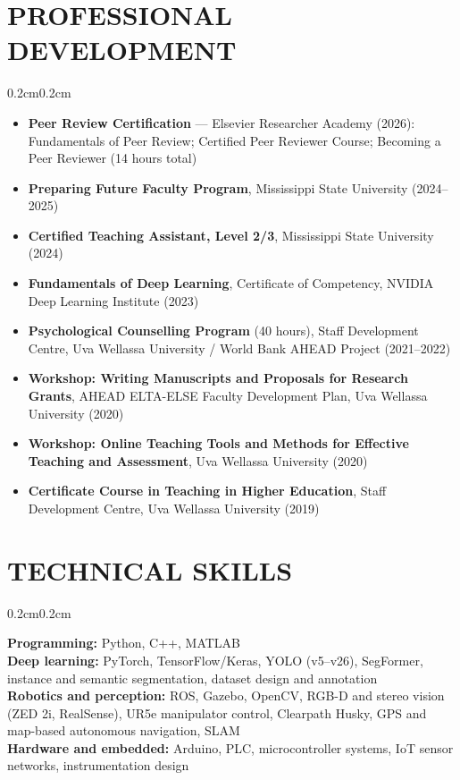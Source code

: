 \documentclass[10pt, letterpaper]{article}
\newenvironment{highlights}{%
    \begin{itemize}[topsep=0.08cm, parsep=0.08cm, partopsep=0pt,
                    itemsep=0pt, leftmargin=0.4cm + 10pt]
}{\end{itemize}}
\newenvironment{onecolentry}{%
    \begin{adjustwidth}{0.2cm}{0.2cm}
}{\end{adjustwidth}}
\begin{document}
\section{PROFESSIONAL DEVELOPMENT}
\vspace{0.08cm}
\begin{onecolentry}
    \begin{highlights}
        \item \textbf{Peer Review Certification} --- Elsevier Researcher Academy
              (2026): Fundamentals of Peer Review; Certified Peer Reviewer Course;
              Becoming a Peer Reviewer (14 hours total)
        \item \textbf{Preparing Future Faculty Program}, Mississippi State University
              (2024--2025)
        \item \textbf{Certified Teaching Assistant, Level 2/3}, Mississippi State
              University (2024)
        \item \textbf{Fundamentals of Deep Learning}, Certificate of Competency,
              NVIDIA Deep Learning Institute (2023)
        \item \textbf{Psychological Counselling Program} (40 hours), Staff Development
              Centre, Uva Wellassa University / World Bank AHEAD Project (2021--2022)
        \item \textbf{Workshop: Writing Manuscripts and Proposals for Research Grants},
              AHEAD ELTA-ELSE Faculty Development Plan, Uva Wellassa University (2020)
        \item \textbf{Workshop: Online Teaching Tools and Methods for Effective
              Teaching and Assessment}, Uva Wellassa University (2020)
        \item \textbf{Certificate Course in Teaching in Higher Education},
              Staff Development Centre, Uva Wellassa University (2019)
    \end{highlights}
\end{onecolentry}
\vspace{0.18cm}

\section{TECHNICAL SKILLS}
\vspace{0.08cm}
\begin{onecolentry}
    \textbf{Programming:} Python, C++, MATLAB \\
    \textbf{Deep learning:} PyTorch, TensorFlow/Keras, YOLO (v5--v26), SegFormer,
    instance and semantic segmentation, dataset design and annotation \\
    \textbf{Robotics and perception:} ROS, Gazebo, OpenCV, RGB-D and stereo
    vision (ZED 2i, RealSense), UR5e manipulator control, Clearpath Husky,
    GPS and map-based autonomous navigation, SLAM \\
    \textbf{Hardware and embedded:} Arduino, PLC, microcontroller systems,
    IoT sensor networks, instrumentation design
\end{onecolentry}
\vspace{0.18cm}
\end{document}
